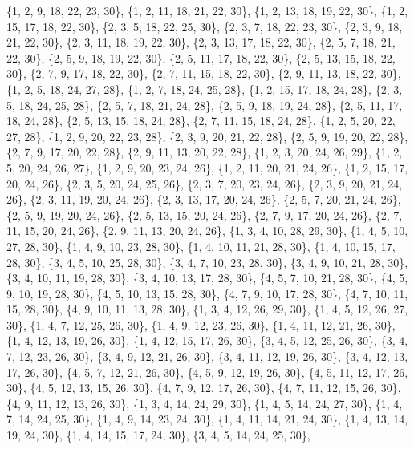 \documentclass[11pt,a4paper]{article}
\begin{document}
{\{1, 2, 9, 18, 22, 23, 30\}, \{1, 2, 11, 18, 21, 22, 30\}, \{1, 2, 13, 18, 19, 22, 30\}, \{1, 2, 15, 17, 18, 22, 30\}, \{2, 3, 5, 18, 22, 25, 30\},
\{2, 3, 7, 18, 22, 23, 30\}, \{2, 3, 9, 18, 21, 22, 30\}, \{2, 3, 11, 18, 19, 22, 30\}, \{2, 3, 13, 17, 18, 22, 30\}, \{2, 5, 7, 18, 21, 22, 30\},
\{2, 5, 9, 18, 19, 22, 30\}, \{2, 5, 11, 17, 18, 22, 30\}, \{2, 5, 13, 15, 18, 22, 30\}, \{2, 7, 9, 17, 18, 22, 30\}, \{2, 7, 11, 15, 18, 22, 30\},
\{2, 9, 11, 13, 18, 22, 30\}, \{1, 2, 5, 18, 24, 27, 28\}, \{1, 2, 7, 18, 24, 25, 28\}, \{1, 2, 15, 17, 18, 24, 28\}, \{2, 3, 5, 18, 24, 25, 28\},
\{2, 5, 7, 18, 21, 24, 28\}, \{2, 5, 9, 18, 19, 24, 28\}, \{2, 5, 11, 17, 18, 24, 28\}, \{2, 5, 13, 15, 18, 24, 28\}, \{2, 7, 11, 15, 18, 24, 28\},
\{1, 2, 5, 20, 22, 27, 28\}, \{1, 2, 9, 20, 22, 23, 28\}, \{2, 3, 9, 20, 21, 22, 28\}, \{2, 5, 9, 19, 20, 22, 28\}, \{2, 7, 9, 17, 20, 22, 28\},
\{2, 9, 11, 13, 20, 22, 28\}, \{1, 2, 3, 20, 24, 26, 29\}, \{1, 2, 5, 20, 24, 26, 27\}, \{1, 2, 9, 20, 23, 24, 26\}, \{1, 2, 11, 20, 21, 24, 26\},
\{1, 2, 15, 17, 20, 24, 26\}, \{2, 3, 5, 20, 24, 25, 26\}, \{2, 3, 7, 20, 23, 24, 26\}, \{2, 3, 9, 20, 21, 24, 26\}, \{2, 3, 11, 19, 20, 24, 26\},
\{2, 3, 13, 17, 20, 24, 26\}, \{2, 5, 7, 20, 21, 24, 26\}, \{2, 5, 9, 19, 20, 24, 26\}, \{2, 5, 13, 15, 20, 24, 26\}, \{2, 7, 9, 17, 20, 24, 26\},
\{2, 7, 11, 15, 20, 24, 26\}, \{2, 9, 11, 13, 20, 24, 26\}, \{1, 3, 4, 10, 28, 29, 30\}, \{1, 4, 5, 10, 27, 28, 30\}, \{1, 4, 9, 10, 23, 28, 30\},
\{1, 4, 10, 11, 21, 28, 30\}, \{1, 4, 10, 15, 17, 28, 30\}, \{3, 4, 5, 10, 25, 28, 30\}, \{3, 4, 7, 10, 23, 28, 30\}, \{3, 4, 9, 10, 21, 28, 30\},
\{3, 4, 10, 11, 19, 28, 30\}, \{3, 4, 10, 13, 17, 28, 30\}, \{4, 5, 7, 10, 21, 28, 30\}, \{4, 5, 9, 10, 19, 28, 30\}, \{4, 5, 10, 13, 15, 28, 30\},
\{4, 7, 9, 10, 17, 28, 30\}, \{4, 7, 10, 11, 15, 28, 30\}, \{4, 9, 10, 11, 13, 28, 30\}, \{1, 3, 4, 12, 26, 29, 30\}, \{1, 4, 5, 12, 26, 27, 30\},
\{1, 4, 7, 12, 25, 26, 30\}, \{1, 4, 9, 12, 23, 26, 30\}, \{1, 4, 11, 12, 21, 26, 30\}, \{1, 4, 12, 13, 19, 26, 30\}, \{1, 4, 12, 15, 17, 26, 30\},
\{3, 4, 5, 12, 25, 26, 30\}, \{3, 4, 7, 12, 23, 26, 30\}, \{3, 4, 9, 12, 21, 26, 30\}, \{3, 4, 11, 12, 19, 26, 30\}, \{3, 4, 12, 13, 17, 26, 30\},
\{4, 5, 7, 12, 21, 26, 30\}, \{4, 5, 9, 12, 19, 26, 30\}, \{4, 5, 11, 12, 17, 26, 30\}, \{4, 5, 12, 13, 15, 26, 30\}, \{4, 7, 9, 12, 17, 26, 30\},
\{4, 7, 11, 12, 15, 26, 30\}, \{4, 9, 11, 12, 13, 26, 30\}, \{1, 3, 4, 14, 24, 29, 30\}, \{1, 4, 5, 14, 24, 27, 30\}, \{1, 4, 7, 14, 24, 25, 30\},
\{1, 4, 9, 14, 23, 24, 30\}, \{1, 4, 11, 14, 21, 24, 30\}, \{1, 4, 13, 14, 19, 24, 30\}, \{1, 4, 14, 15, 17, 24, 30\}, \{3, 4, 5, 14, 24, 25, 30\},
}
\end{document}
